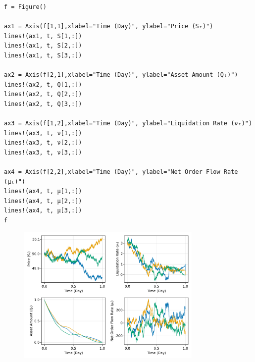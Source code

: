 \begin{lstlisting}[language=JuliaLocal, style=julia]
f = Figure()

ax1 = Axis(f[1,1],xlabel="Time (Day)", ylabel="Price (Sₜ)")
lines!(ax1, t, S[1,:])
lines!(ax1, t, S[2,:])
lines!(ax1, t, S[3,:])

ax2 = Axis(f[2,1],xlabel="Time (Day)", ylabel="Asset Amount (Qₜ)")
lines!(ax2, t, Q[1,:])
lines!(ax2, t, Q[2,:])
lines!(ax2, t, Q[3,:])

ax3 = Axis(f[1,2],xlabel="Time (Day)", ylabel="Liquidation Rate (νₜ)")
lines!(ax3, t, ν[1,:])
lines!(ax3, t, ν[2,:])
lines!(ax3, t, ν[3,:])

ax4 = Axis(f[2,2],xlabel="Time (Day)", ylabel="Net Order Flow Rate (μₜ)")
lines!(ax4, t, μ[1,:])
lines!(ax4, t, μ[2,:])
lines!(ax4, t, μ[3,:])
f
\end{lstlisting}

\begin{figure}[H]
	\centering
	\includegraphics[width=0.8\textwidth]{./figures/Trabalho1_figure2.pdf}
	\label{fig:Trabalho1_figure2}

\end{figure}
